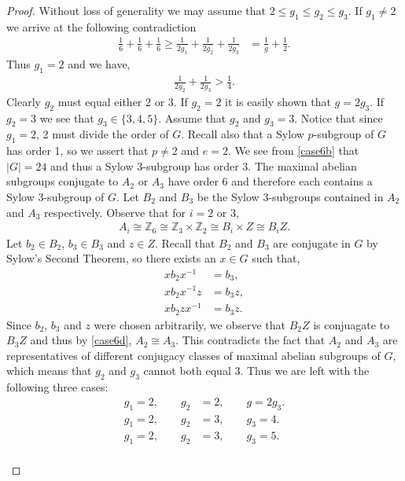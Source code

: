 \begin{proof}
Without loss of generality we may assume that $2 \leq g_1 \leq g_2 \leq g_3$. If $g_1 \neq 2$ we arrive at the following contradiction
\begin{align*} \frac{1}{6} + \frac{1}{6} + \frac{1}{6} \geq \frac{1}{2g_1} + \frac{1}{2g_2} + \frac{1}{2g_3} &= \frac{1}{g} + \frac{1}{2}.
\end{align*}
Thus $g_1 = 2$ and we have,
\begin{align}\label{case6c} \frac{1}{2g_2} + \frac{1}{2g_3} > \frac{1}{4}.
\end{align}
\newpage
Clearly $g_2$ must equal either 2 or 3. If $g_2 = 2$ it is easily shown that $g=2 g_3$. If $g_2 = 3$ we see that $g_3 \in \{ 3,4,5 \}$. Assume that $g_2$ and $g_3 = 3$. Notice that since  $g_1 = 2$, 2 must divide the order of $G$. Recall also that a Sylow $p$-subgroup of $G$ has order 1, so we assert that $p \neq 2$ and $e=2$. We see from \eqref{case6b} that $|G| = 24$ and thus a Sylow $3$-subgroup has order 3. The maximal abelian subgroups conjugate to $A_2$ or $A_3$ have order 6 and therefore each contains a Sylow $3$-subgroup of $G$. Let $B_2$ and $B_3$ be the Sylow $3$-subgroups contained in $A_2$ and $A_3$ respectively. Observe that for $i = 2$ or 3,
\begin{align}\label{case6d} A_i \cong \mathbb{Z}_6 \cong \mathbb{Z}_3 \times \mathbb{Z}_2 \cong B_i \times Z \cong B_i Z. 
\end{align}
Let $b_2 \in B_2$, $b_3 \in B_3$ and $z \in Z$. Recall that $B_2$ and $B_3$ are conjugate in $G$ by Sylow's Second Theorem, so there exists an $x \in G$ such that,
\begin{align*} x b_2 x^{-1} &= b_3,
\\ x b_2 x^{-1} z &= b_3 z,
\\ x b_2 z x^{-1} &= b_3 z.
\end{align*} 
Since $b_2$, $b_3$ and $z$ were chosen arbitrarily, we observe that $B_2 Z$ is conjuagate to $B_3 Z$ and thus by \eqref{case6d}, $A_2 \cong A_3$. This contradicts the fact that $A_2$ and $A_3$ are representatives of different conjugacy classes of maximal abelian subgroups of $G$, which means that $g_2$ and $g_3$ cannot both equal 3. Thus we are left with the following three cases:
\begin{align*} g_1 = 2, \qquad g_2&=2, \qquad g=2 g_3.
\\[1ex] g_1 = 2, \qquad g_2&=3, \qquad g_3 = 4.
\\[1ex] g_1 = 2, \qquad g_2&=3, \qquad g_3 = 5.
\end{align*}
\\

\end{proof}
